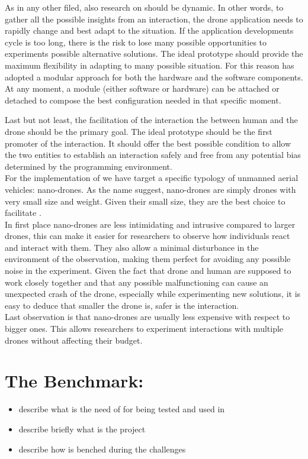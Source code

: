 As in any other filed, also research on \hdi{} should be dynamic. In other words, to gather all the possible insights from an interaction, the drone application needs to rapidly change and best adapt to the situation. If the application developments cycle is too long, there is the risk to lose many possible opportunities to experiments possible alternative solutions. The ideal prototype should provide the maximum flexibility in adapting to many possible situation.
For this reason \easyfly{} has adopted a modular approach for both the hardware and the software components. At any moment, a module (either software or hardware) can be attached or detached to compose the best configuration needed in that specific moment.

Last but not least, the facilitation of the interaction the between human and the drone should be the primary goal. The ideal prototype should be the first promoter of the interaction. It should offer the best possible condition to allow the two entities to establish an interaction safely and free from any potential bias determined by the programming environment.\\
For the implementation of \easyfly{} we have target a specific typology of unmanned aerial vehicles: nano-drones. As the name suggest, nano-drones are simply drones with very small size and weight. Given their small size, they are the best choice to facilitate \hdi{}.\\
In first place nano-drones are less intimidating and intrusive compared to larger drones, this can make it easier for researchers to observe how individuals react and interact with them. They also allow a minimal disturbance in the environment of the observation, making them perfect for avoiding any possible noise in the experiment. Given the fact that drone and human are supposed to work closely together and that any possible malfunctioning can cause an unexpected crash of the drone, especially while experimenting new solutions, it is easy to deduce that smaller the drone is, safer is the interaction.\\ 
Last observation is that nano-drones are usually less expensive with respect to bigger ones. This allows researchers to experiment interactions with multiple drones without affecting their budget.



\section{The Benchmark: \Dronearena}
\label{sec:the_benchmark}
\begin{itemize}
    \item describe what is the need of \easyfly{} for being tested and used in \hdi
    \item describe briefly what is the \Dronearena project
    \item describe how \easyfly is benched during the \Dronearena challenges
\end{itemize}

